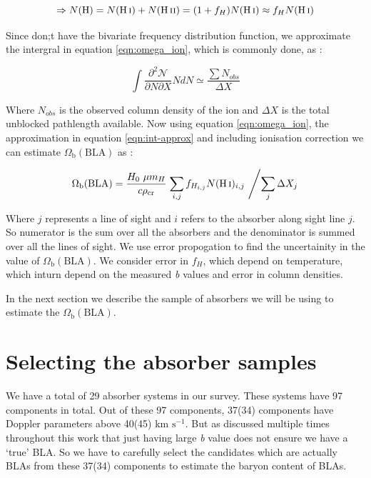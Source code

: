 \begin{equation*}
     \Rightarrow  N(\text{H}) = N(\ion{H}{i})+N(\ion{H}{ii}) = (1+f_H)N(\ion{H}{i}) \approx f_H N(\ion{H}{i})
\end{equation*}

Since don;t have the bivariate frequency distribution function, we approximate the intergral in equation \ref{eqn:omega_ion}, which is commonly done, as : 

\begin{equation} \label{eqn:int-approx}
    \int \frac{\partial ^2 \mathcal{N}}{\partial N  \partial X} N dN \simeq \frac{\sum N_{obs}}{\Delta X} 
\end{equation}

Where $N_{obs}$ is the observed column density of the ion and $\Delta X$ is the total unblocked pathlength available. Now using equation \ref{eqn:omega_ion}, the approximation in equation \ref{eqn:int-approx} and including ionisation correction we can estimate $\Omega_\text{b}(\text{BLA})$ as :

\begin{equation}
    \Omega_\text{b}(\text{BLA}) = \frac{H_0 \ \mu m_H}{c \rho_{\text{cr}}} \left. \sum_{i,j} f_{H_{i,j}} N(\ion{H}{i})_{i,j} \ \middle / \sum_j \Delta X_j \right.
\end{equation}

Where $j$ represents a line of sight and $i$ refers to the absorber along sight line $j$. So numerator is the sum over all the absorbers and the denominator is summed over all the lines of sight.  We use error propogation to find the uncertainity in the value of $\Omega_\text{b}(\text{BLA})$. We consider error in $f_H$, which depend on temperature, which inturn depend on the measured \emph{b} values and error in  column densities.  

In the next section we describe the sample of absorbers we will be using to estimate the $\Omega_\text{b}(\text{BLA})$.

\section{Selecting the absorber samples}

We have a total of 29 absorber systems in our survey. These systems have 97  components in total. Out of these 97 components, 37(34) components have Doppler parameters above 40(45) km $\text{s}^{-1}$. But as discussed multiple times throughout this work that just having large \emph{b} value does not ensure we have a `true' BLA. So we have to carefully select the candidates which are actually BLAs from these 37(34) components to estimate the baryon content of BLAs. 

